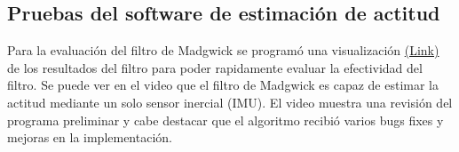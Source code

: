 \subsection{Pruebas del software de estimación de actitud}
Para la evaluación del filtro de Madgwick se programó una visualización \href{https://www.youtube.com/watch?v=M0_s6UW86cs&ab_channel=PatricioWhittingslow}{(Link)} de los resultados del filtro para poder rapidamente evaluar la efectividad del filtro. Se puede ver en el video que el filtro de Madgwick es capaz de estimar la actitud mediante un solo sensor inercial (IMU). El video muestra una revisión del programa preliminar y cabe destacar que el algoritmo recibió varios bugs fixes y mejoras en la implementación. 

